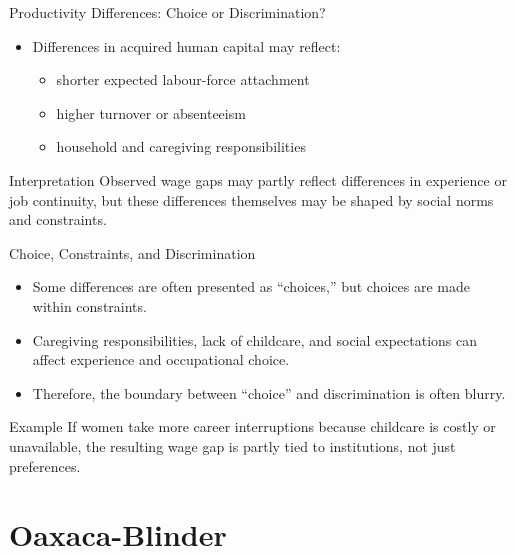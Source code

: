 \documentclass[aspectratio=169]{beamer}
\begin{document}
\begin{frame}{Productivity Differences: Choice or Discrimination?}
\transfade
\begin{itemize}
  \item Differences in acquired human capital may reflect:
  \begin{itemize}
    \item shorter expected labour-force attachment
    \item higher turnover or absenteeism
    \item household and caregiving responsibilities
  \end{itemize}
\end{itemize}

\begin{block}{Interpretation}
Observed wage gaps may partly reflect differences in experience or job continuity, but these differences themselves may be shaped by social norms and constraints.
\end{block}
\end{frame}

\begin{frame}{Choice, Constraints, and Discrimination}
\transfade
\begin{itemize}
  \item Some differences are often presented as ``choices,'' but choices are made within constraints.
  \item Caregiving responsibilities, lack of childcare, and social expectations can affect experience and occupational choice.
  \item Therefore, the boundary between ``choice'' and discrimination is often blurry.
\end{itemize}

\begin{exampleblock}{Example}
If women take more career interruptions because childcare is costly or unavailable, the resulting wage gap is partly tied to institutions, not just preferences.
\end{exampleblock}
\end{frame}

\section{Oaxaca-Blinder}
\end{document}
